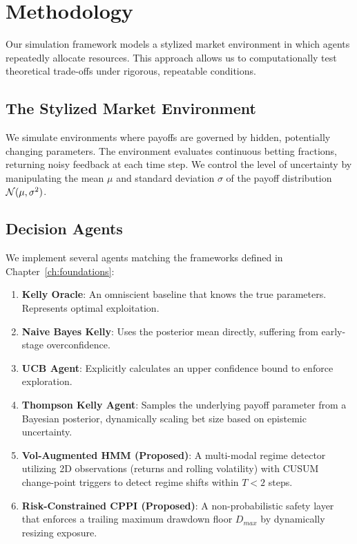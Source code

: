 \chapter{Methodology}
\label{ch:methodology}

Our simulation framework models a stylized market environment in which agents repeatedly allocate resources. This approach allows us to computationally test theoretical trade-offs under rigorous, repeatable conditions.

\section{The Stylized Market Environment}
We simulate environments where payoffs are governed by hidden, potentially changing parameters. The environment evaluates continuous betting fractions, returning noisy feedback at each time step. We control the level of uncertainty by manipulating the mean $\mu$ and standard deviation $\sigma$ of the payoff distribution $\mathcal{N}(\mu, \sigma^2)$.

\section{Decision Agents}
We implement several agents matching the frameworks defined in Chapter~\ref{ch:foundations}:
\begin{enumerate}
    \item \textbf{Kelly Oracle}: An omniscient baseline that knows the true parameters. Represents optimal exploitation.
    \item \textbf{Naive Bayes Kelly}: Uses the posterior mean directly, suffering from early-stage overconfidence.
    \item \textbf{UCB Agent}: Explicitly calculates an upper confidence bound to enforce exploration.
    \item \textbf{Thompson Kelly Agent}: Samples the underlying payoff parameter from a Bayesian posterior, dynamically scaling bet size based on epistemic uncertainty.
    \item \textbf{Vol-Augmented HMM (Proposed)}: A multi-modal regime detector utilizing 2D observations (returns and rolling volatility) with CUSUM change-point triggers to detect regime shifts within $T < 2$ steps.
    \item \textbf{Risk-Constrained CPPI (Proposed)}: A non-probabilistic safety layer that enforces a trailing maximum drawdown floor $D_{max}$ by dynamically resizing exposure.
\end{enumerate}

